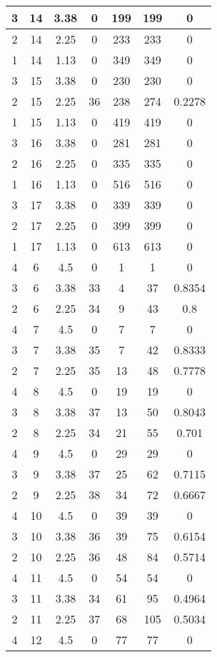 \documentclass[letterpaper, 12pt]{article}
\begin{document}
\begin{longtable}{|c|c|c|c|c|c|c|}
\hline
3 & 14 & 3.38 & 0 & 199 & 199 & 0 \\
\hline
2 & 14 & 2.25 & 0 & 233 & 233 & 0 \\
\hline
1 & 14 & 1.13 & 0 & 349 & 349 & 0 \\
\hline
3 & 15 & 3.38 & 0 & 230 & 230 & 0 \\
\hline
2 & 15 & 2.25 & 36 & 238 & 274 & 0.2278 \\
\hline
1 & 15 & 1.13 & 0 & 419 & 419 & 0 \\
\hline
3 & 16 & 3.38 & 0 & 281 & 281 & 0 \\
\hline
2 & 16 & 2.25 & 0 & 335 & 335 & 0 \\
\hline
1 & 16 & 1.13 & 0 & 516 & 516 & 0 \\
\hline
3 & 17 & 3.38 & 0 & 339 & 339 & 0 \\
\hline
2 & 17 & 2.25 & 0 & 399 & 399 & 0 \\
\hline
1 & 17 & 1.13 & 0 & 613 & 613 & 0 \\
\hline
4 & 6 & 4.5 & 0 & 1 & 1 & 0 \\
\hline
3 & 6 & 3.38 & 33 & 4 & 37 & 0.8354 \\
\hline
2 & 6 & 2.25 & 34 & 9 & 43 & 0.8 \\
\hline
4 & 7 & 4.5 & 0 & 7 & 7 & 0 \\
\hline
3 & 7 & 3.38 & 35 & 7 & 42 & 0.8333 \\
\hline
2 & 7 & 2.25 & 35 & 13 & 48 & 0.7778 \\
\hline
4 & 8 & 4.5 & 0 & 19 & 19 & 0 \\
\hline
3 & 8 & 3.38 & 37 & 13 & 50 & 0.8043 \\
\hline
2 & 8 & 2.25 & 34 & 21 & 55 & 0.701 \\
\hline
4 & 9 & 4.5 & 0 & 29 & 29 & 0 \\
\hline
3 & 9 & 3.38 & 37 & 25 & 62 & 0.7115 \\
\hline
2 & 9 & 2.25 & 38 & 34 & 72 & 0.6667 \\
\hline
4 & 10 & 4.5 & 0 & 39 & 39 & 0 \\
\hline
3 & 10 & 3.38 & 36 & 39 & 75 & 0.6154 \\
\hline
2 & 10 & 2.25 & 36 & 48 & 84 & 0.5714 \\
\hline
4 & 11 & 4.5 & 0 & 54 & 54 & 0 \\
\hline
3 & 11 & 3.38 & 34 & 61 & 95 & 0.4964 \\
\hline
2 & 11 & 2.25 & 37 & 68 & 105 & 0.5034 \\
\hline
4 & 12 & 4.5 & 0 & 77 & 77 & 0 \\

\end{longtable}
\end{document}
